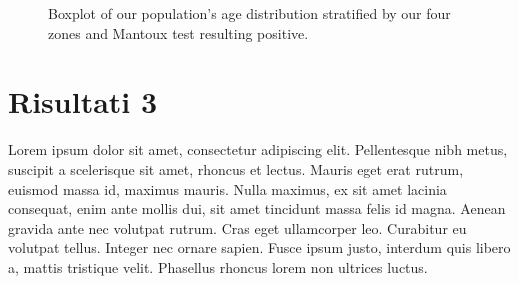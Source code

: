 \begin{figure}[H]
\caption{Boxplot of our population's age distribution stratified by our four zones and Mantoux test resulting positive.}
\label{fig:boxplot_Mantoux}
\end{figure}

\section{Risultati 3}\label{sec:risultati3}
Lorem ipsum dolor sit amet, consectetur adipiscing elit. Pellentesque nibh metus, suscipit a scelerisque sit amet, rhoncus et lectus. Mauris eget erat rutrum, euismod massa id, maximus mauris. Nulla maximus, ex sit amet lacinia consequat, enim ante mollis dui, sit amet tincidunt massa felis id magna. Aenean gravida ante nec volutpat rutrum. Cras eget ullamcorper leo. Curabitur eu volutpat tellus. Integer nec ornare sapien. Fusce ipsum justo, interdum quis libero a, mattis tristique velit. Phasellus rhoncus lorem non ultrices luctus.

